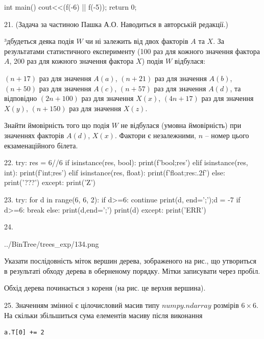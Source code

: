 \documentclass[11pt]{article}
\begin{document}
int main(){
    cout<<(f(-6) || f(-5));
    return 0;
}

21. 
(Задача за частиною Пашка А.О. Наводиться в авторській редакції.)\par {\hspace {0.5 cm}}³дбудеться деяка подія $W$ чи ні залежить від двох факторів $A$ та $X$. За результатами статистичного експерименту (100 раз для кожного значення фактора $A$,  200 раз для кожного значення фактора $X$) подія $W$ відбулася:\par {\hspace {0.5 cm}}$(n+17)$ раз для значення $A(a)$, $(n+21)$ раз для значення $A(b)$, $(n+50)$ раз для значення $A(c)$, $(n+57)$ раз для значення $A(d)$, та відповідно $(2n+100)$ раз для значення $X(x)$, $(4n+17)$ раз для значення $X(y)$, $(n+150)$ раз для значення $X(z)$.\par
{\hspace {0.5 cm}}Знайти ймовірність того що подія $W$ не відбулася (умовна ймовірність) при значеннях факторів $A(d)$, $X(x)$. Фактори є незалежними, $n$ – номер цього екзаменаційного білета.\par
22. 
try:
    res = 6//6%
    if isinstance(res, bool):
        print(f'bool;{res}')
    elif isinstance(res, int):
        print(f'int;{res}')
    elif isinstance(res, float):
        print(f'float;{res:.2f}')
    else:
        print('???')
except:
    print('Z')

23. 
try:
    for d in range(6, 6, 2):
        if d>=6:
            continue
        print(d, end=';');d = -7
        if d>=6:
            break
    else:
        print(d,end=';')
    print(d)
except:
    print('ERR')

24. 

\begin{center}
	{../BinTree/trees_exp/134.png}
\end{center}
Указати послідовність міток вершин дерева, зображеного на рис., що утвориться в результаті обходу дерева в оберненому порядку. Мітки записувати через пробіл.\par Обхід дерева починається з кореня (на рис. це верхня вершина).

25. 
Значенням змінної  є цілочисловий масив типу $numpy.ndarray$ розмірів $6{\times}6$. На скільки збільшиться сума елементів масиву  після виконання
\begin{verbatim}
a.T[0] += 2
\end{verbatim}
\end{document}
